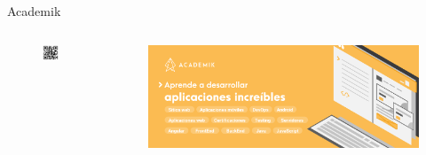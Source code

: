 \documentclass[aspectratio=169]{beamer}
\begin{document}
\begin{frame}[fragile]{Academik}
    \begin{columns}[T]
        \begin{column}[T]{2cm} %
            \begin{figure}
                \centering
                \includegraphics[width=\linewidth]{Images/qr}
            \end{figure}
        \end{column}
        \begin{column}[T]{12cm} %
        \begin{figure}
            \centering
            \includegraphics[width=\linewidth]{Images/academik}
        \end{figure}
        \end{column}
    \end{columns}
\end{frame}
\end{document}
